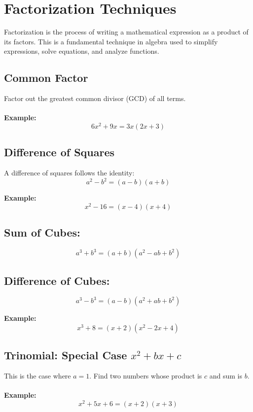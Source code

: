 \newpage
\section{Factorization Techniques}

Factorization is the process of writing a mathematical expression as a product of its factors. This is a fundamental technique in algebra used to simplify expressions, solve equations, and analyze functions.

\subsection{Common Factor}

Factor out the greatest common divisor (GCD) of all terms.
\\\\
\textbf{Example:}
\[
6x^2 + 9x = 3x(2x + 3)
\]

\subsection{Difference of Squares}

A difference of squares follows the identity:
\[
a^2 - b^2 = (a - b)(a + b)
\]

\textbf{Example:}
\[
x^2 - 16 = (x - 4)(x + 4)
\]


\subsection{Sum of Cubes:}
\[
a^3 + b^3 = (a + b)(a^2 - ab + b^2)
\]

\subsection{Difference of Cubes:}
\[
a^3 - b^3 = (a - b)(a^2 + ab + b^2)
\]

\textbf{Example:}
\[
x^3 + 8 = (x + 2)(x^2 - 2x + 4)
\]


\subsection{Trinomial: Special Case \texorpdfstring{\(x^2 + bx + c\)}{x² + bx + c}}

This is the case where \(a = 1\). Find two numbers whose product is \(c\) and sum is \(b\).
\\\\
\textbf{Example:}
\[
x^2 + 5x + 6 = (x + 2)(x + 3)
\]


